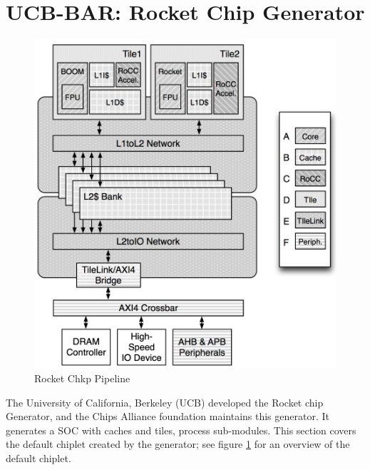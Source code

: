 \documentclass[../main.tex]{subfiles}
\begin{document}
\section{UCB-BAR: Rocket Chip Generator}
\begin{figure}
    \centering
    \includegraphics[scale=.5]{pngs/RocketChipGeneratorLayout.png}
    \caption{Rocket Chkp Pipeline\cite{Asanović:EECS-2016-17}}
    \label{fig:RocketCipGen}
\end{figure}
The University of California, Berkeley (UCB) developed the Rocket chip Generator, and the Chips Alliance foundation maintains this generator\cite{Chips-Alliance}. It generates a SOC with caches and tiles, process sub-modules. This section covers the default chiplet created by the generator; see figure \ref{fig:RocketCipGen} for an overview of the default chiplet.
\end{document}
